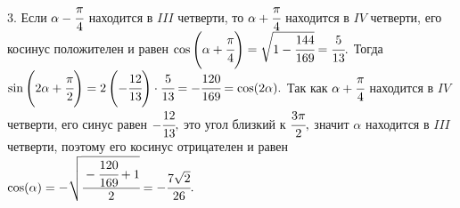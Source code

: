 3. Если $\alpha-\cfrac{\pi}{4}$ находится в $III$ четверти, то $\alpha+\cfrac{\pi}{4}$ находится в $IV$ четверти, его косинус положителен и равен $\cos\left(\alpha+\cfrac{\pi}{4}\right)=\sqrt{1-\cfrac{144}{169}}=\cfrac{5}{13}.$ Тогда $\sin\left(2\alpha+\cfrac{\pi}{2}\right)=2\left(-\cfrac{12}{13}\right)\cdot
\cfrac{5}{13}=-\cfrac{120}{169}=\cos(2\alpha).$ Так как $\alpha+\cfrac{\pi}{4}$ находится в $IV$ четверти, его синус равен $-\cfrac{12}{13},$ это угол близкий
к $\cfrac{3\pi}{2},$ значит $\alpha$ находится в $III$ четверти, поэтому его косинус отрицателен и равен $\cos(\alpha)=-\sqrt{\cfrac{-\cfrac{120}{169}+1}{2}}=-\cfrac{7\sqrt{2}}{26}.$\\
